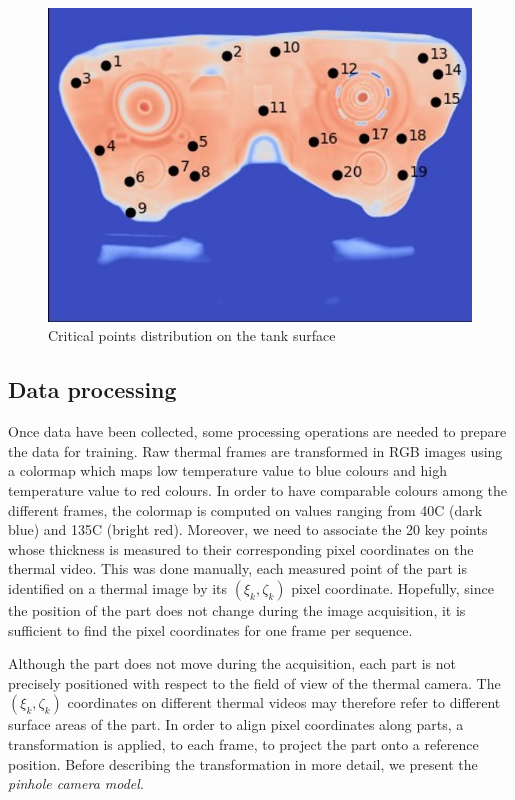\begin{figure}
\centering
\includegraphics[scale=1]{images/chapter_4/critical_points.jpg}
\caption{Critical points distribution on the tank surface}
\label{fig:critical_points}
\end{figure}

\subsection{Data processing}

Once data have been collected, some processing operations are needed to prepare the data for training. Raw thermal frames are transformed in RGB images using a colormap which maps low temperature value to blue colours and high temperature value to red colours. In order to have comparable colours among the different frames, the colormap is computed on values ranging from 40\degree C (dark blue) and 135\degree C (bright red). Moreover, we need to associate the 20 key points whose thickness is measured to their corresponding pixel coordinates on the thermal video. This was done manually, each measured point of the part is identified on a thermal image by its $(\xi_{k}, \zeta_{k})$ pixel coordinate. Hopefully, since the position of the part does not change during the image acquisition, it is sufficient to find the pixel coordinates for one frame per sequence. 

Although the part does not move during the acquisition, each part is not precisely positioned with respect to the field of view of the thermal camera. The  $(\xi_{k}, \zeta_{k})$ coordinates on different thermal videos may therefore refer to different surface areas of the part. In order to align pixel coordinates along parts, a transformation is applied, to each frame, to project the part onto a reference position. Before describing the transformation in more detail, we present the \textit{pinhole camera model}. 

